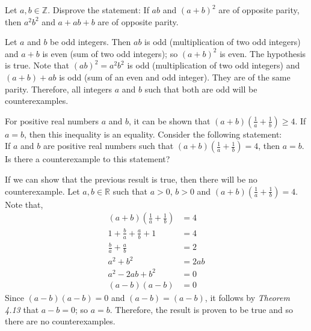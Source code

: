 \documentclass[12pt]{article}
\newcommand{\Z}{\mathbb{Z}}
\newcommand{\R}{\mathbb{R}}
\newenvironment{problem}[2][Problem]{\begin{trivlist}
		\item[\hskip \labelsep {\bfseries #1}\hskip \labelsep {\bfseries #2.}]}{\end{trivlist}}
\newenvironment{solution}[2][Solution]{\begin{trivlist}
		\item[\hskip \labelsep {\bfseries #1}\hskip \labelsep {\bfseries #2.}]}{\end{trivlist}}
\begin{document}
	\begin{problem}{6}
		Let $a,b \in \Z$. Disprove the statement: If $ab$ and $(a+b)^{2}$ are of opposite parity, then $a^{2}b^{2}$ and $a+ab+b$ are of opposite parity.
		\begin{solution}{}
			Let $a$ and $b$ be odd integers. Then $ab$ is odd (multiplication of two odd integers) and $a+b$ is even (sum of two odd integers); so $(a+b)^{2}$ is even. The hypothesis is true. Note that $(ab)^{2} = a^{2}b^{2}$ is odd (multiplication of two odd integers) and $(a+b) + ab$ is odd (sum of an even and odd integer). They are of the same parity. Therefore, all integers $a$ and $b$ such that both are odd will be counterexamples.
			
		\end{solution}
	\end{problem}
	
	\begin{problem}{7}
		For positive real numbers $a$ and $b$, it can be shown that $(a+b)\left(\frac{1}{a} + \frac{1}{b}\right)\geq 4$. If $a=b$, then this inequality is an equality. Consider the following statement:\\
		If $a$ and $b$ are positive real numbers such that $(a+b)\left(\frac{1}{a}+\frac{1}{b}\right) = 4$, then $a=b$. Is there a counterexample to this statement?
		\begin{solution}{}
			If we can show that the previous result is true, then there will be no counterexample. Let $a,b\in \R$ such that $a>0$, $b>0$ and $(a+b)\left(\frac{1}{a}+\frac{1}{b}\right) = 4$. Note that,
			\begin{align*}
				(a+b)\left(\frac{1}{a}+\frac{1}{b}\right) &= 4\\
				1+\frac{b}{a}+\frac{a}{b}+1 &= 4\\
				\frac{b}{a}+\frac{a}{b} &= 2\\
				a^{2}+b^{2} &= 2ab\\
				a^{2}-2ab+b^{2} &= 0\\
				(a-b)(a-b) &= 0
			\end{align*}
		Since $(a-b)(a-b) = 0$ and $(a-b)=(a-b)$, it follows by \textit{Theorem 4.13} that $a-b = 0$; so $a=b$. Therefore, the result is proven to be true and so there are no counterexamples. 
		\end{solution} 
	\end{problem}
\end{document}
